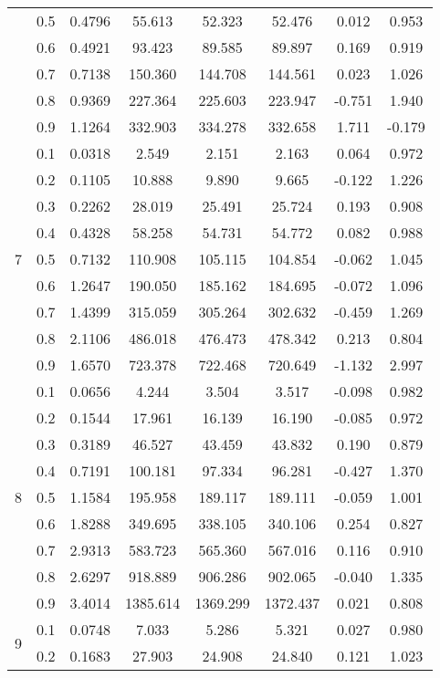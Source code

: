 \documentclass[11pt,a4paper]{report}
\begin{document}
\begin{longtable}{ | c | c || c | c | c | c | c | c | }
 & 0.5 & 0.4796 & 55.613 & 52.323 & 52.476 & 0.012 & 0.953 \\
 & 0.6 & 0.4921 & 93.423 & 89.585 & 89.897 & 0.169 & 0.919 \\
 & 0.7 & 0.7138 & 150.360 & 144.708 & 144.561 & 0.023 & 1.026 \\
 & 0.8 & 0.9369 & 227.364 & 225.603 & 223.947 & -0.751 & 1.940 \\
 & 0.9 & 1.1264 & 332.903 & 334.278 & 332.658 & 1.711 & -0.179 \\
 \hline
\multirow{9}{*}{7} & 0.1 & 0.0318 & 2.549 & 2.151 & 2.163 & 0.064 & 0.972 \\
 & 0.2 & 0.1105 & 10.888 & 9.890 & 9.665 & -0.122 & 1.226 \\
 & 0.3 & 0.2262 & 28.019 & 25.491 & 25.724 & 0.193 & 0.908 \\
 & 0.4 & 0.4328 & 58.258 & 54.731 & 54.772 & 0.082 & 0.988 \\
 & 0.5 & 0.7132 & 110.908 & 105.115 & 104.854 & -0.062 & 1.045 \\
 & 0.6 & 1.2647 & 190.050 & 185.162 & 184.695 & -0.072 & 1.096 \\
 & 0.7 & 1.4399 & 315.059 & 305.264 & 302.632 & -0.459 & 1.269 \\
 & 0.8 & 2.1106 & 486.018 & 476.473 & 478.342 & 0.213 & 0.804 \\
 & 0.9 & 1.6570 & 723.378 & 722.468 & 720.649 & -1.132 & 2.997 \\
 \hline
\multirow{9}{*}{8} & 0.1 & 0.0656 & 4.244 & 3.504 & 3.517 & -0.098 & 0.982 \\
 & 0.2 & 0.1544 & 17.961 & 16.139 & 16.190 & -0.085 & 0.972 \\
 & 0.3 & 0.3189 & 46.527 & 43.459 & 43.832 & 0.190 & 0.879 \\
 & 0.4 & 0.7191 & 100.181 & 97.334 & 96.281 & -0.427 & 1.370 \\
 & 0.5 & 1.1584 & 195.958 & 189.117 & 189.111 & -0.059 & 1.001 \\
 & 0.6 & 1.8288 & 349.695 & 338.105 & 340.106 & 0.254 & 0.827 \\
 & 0.7 & 2.9313 & 583.723 & 565.360 & 567.016 & 0.116 & 0.910 \\
 & 0.8 & 2.6297 & 918.889 & 906.286 & 902.065 & -0.040 & 1.335 \\
 & 0.9 & 3.4014 & 1385.614 & 1369.299 & 1372.437 & 0.021 & 0.808 \\
 \hline
\multirow{9}{*}{9} & 0.1 & 0.0748 & 7.033 & 5.286 & 5.321 & 0.027 & 0.980 \\
 & 0.2 & 0.1683 & 27.903 & 24.908 & 24.840 & 0.121 & 1.023 \\

\end{longtable}
\end{document}
